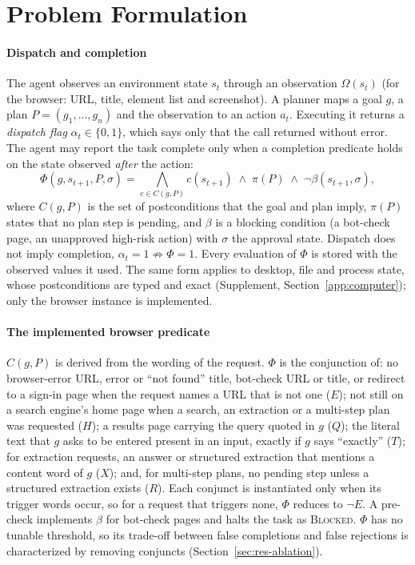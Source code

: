 \section{Problem Formulation}
\label{sec:problem}

\paragraph{Dispatch and completion} The agent observes an environment state $s_t$ through an observation $\Omega(s_t)$ (for the browser: URL, title, element list and screenshot). A planner maps a goal $g$, a plan $P=(g_1,\dots,g_n)$ and the observation to an action $a_t$. Executing it returns a \emph{dispatch flag} $\alpha_t\in\{0,1\}$, which says only that the call returned without error. The agent may report the task complete only when a completion predicate holds on the state observed \emph{after} the action:
\begin{equation}
\Phi(g,s_{t+1},P,\sigma) = \textstyle\bigwedge_{c\in C(g,P)} c(s_{t+1}) \;\wedge\; \pi(P) \;\wedge\; \neg\beta(s_{t+1},\sigma),
\label{eq:phi-general}
\end{equation}
where $C(g,P)$ is the set of postconditions that the goal and plan imply, $\pi(P)$ states that no plan step is pending, and $\beta$ is a blocking condition (a bot-check page, an unapproved high-risk action) with $\sigma$ the approval state. Dispatch does not imply completion, $\alpha_t=1\not\Rightarrow\Phi=1$. Every evaluation of $\Phi$ is stored with the observed values it used. The same form applies to desktop, file and process state, whose postconditions are typed and exact (Supplement, Section~\ref{app:computer}); only the browser instance is implemented.

\paragraph{The implemented browser predicate} $C(g,P)$ is derived from the wording of the request. $\Phi$ is the conjunction of: no browser-error URL, error or ``not found'' title, bot-check URL or title, or redirect to a sign-in page when the request names a URL that is not one ($E$); not still on a search engine's home page when a search, an extraction or a multi-step plan was requested ($H$); a results page carrying the query quoted in $g$ ($Q$); the literal text that $g$ asks to be entered present in an input, exactly if $g$ says ``exactly'' ($T$); for extraction requests, an answer or structured extraction that mentions a content word of $g$ ($X$); and, for multi-step plans, no pending step unless a structured extraction exists ($R$). Each conjunct is instantiated only when its trigger words occur, so for a request that triggers none, $\Phi$ reduces to $\neg E$. A pre-check implements $\beta$ for bot-check pages and halts the task as \textsc{Blocked}. $\Phi$ has no tunable threshold, so its trade-off between false completions and false rejections is characterized by removing conjuncts (Section~\ref{sec:res-ablation}).

